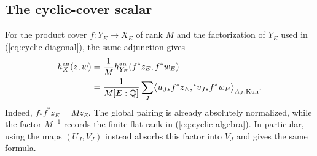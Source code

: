\documentclass[11pt,a4paper]{article}
\theoremstyle{definition}
\theoremstyle{remark}\newtheorem{remark}[theorem]{Remark}
\numberwithin{equation}{section}
\newcommand{\Q}{\mathbb Q}\newcommand{\R}{\mathbb R}\newcommand{\C}{\mathbb C}
\renewcommand{\eqref}[1]{\hyperref[#1]{\textcolor{equationlink}{(\ref*{#1})}}}
\begin{document}
\subsection{The cyclic-cover scalar}

For the product cover $f:Y_E\to X_E$ of rank $M$ and the
factorization of $Y_E$ used in \eqref{eq:cyclic-diagonal},
the same adjunction gives
\begin{align}
 h_X^{\an}(z,w)
 &=\frac1M h_{Y_E}^{\an}(f^*z_E,f^*w_E)\notag\\
 &=\frac1{M[E:\Q]}\sum_J
   \bigl\langle u_{J*}f^*z_E,{}^tv_{J*}f^*w_E
              \bigr\rangle_{A_J,\mathrm{Kun}}.\label{eq:cyclic-height}
\end{align}
Indeed, $f_*f^*z_E=M z_E$. The global pairing is already
absolutely normalized, while the factor $M^{-1}$ records the
finite flat rank in \eqref{eq:cyclic-algebra}. In particular,
using the maps $(U_J,V_J)$ instead absorbs this factor into
$V_J$ and gives the same formula.
\end{document}
